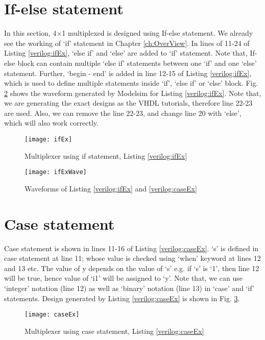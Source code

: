 \section{If-else statement} \label{sec:ifElse}
In this section, 4$\times$1 multiplexed is designed using If-else statement. We already see the working of `if' statement in Chapter \ref{ch:OverView}. In lines of 11-24 of Listing \ref{verilog:ifEx}, `else if' and `else' are added to `if' statement. Note that, If-else block can contain multiple `else if' statements between one `if' and one `else' statement. Further, `begin - end' is added in line 12-15 of Listing \ref{verilog:ifEx}, which is used to define multiple statements inside `if', `else if' or `else' block.  Fig. \ref{fig:ifExWave} shows the waveform generated by Modelsim for Listing \ref{verilog:ifEx}. 
Note that, we are generating the exact designs as the VHDL tutorials, therefore line 22-23 are used. Also, we can remove the line 22-23, and change line 20 with `else', which will also work correctly. 

\begin{figure}[!h]
	\centering
	\texttt{[image: ifEx]}
	\caption{Multiplexer using if statement, Listing \ref{verilog:ifEx}}
	\label{fig:ifEx}
\end{figure} 



\begin{figure}
	\centering
	\texttt{[image: ifExWave]}
	\caption{Waveforms of Listing \ref{verilog:ifEx} and \ref{verilog:caseEx}}
	\label{fig:ifExWave}
\end{figure}
%
%
%
%
\section{Case statement}
Case statement is shown in lines 11-16 of Listing \ref{verilog:caseEx}. `s' is defined in case statement at line 11; whose value is checked using `when' keyword at lines 12 and 13 etc. The value of y depends on the value of `s' e.g. if `s' is `1', then line 12 will be true, hence value of `i1' will be assigned to `y'. Note that, we can use `integer' notation (line 12) as well as `binary' notation (line 13)  in `case' and `if' statements. Design generated by Listing \ref{verilog:caseEx} is shown in Fig. \ref{fig:caseEx}.


\begin{figure}[!h]
	\centering
	\texttt{[image: caseEx]}
	\caption{Multiplexer using case statement, Listing \ref{verilog:caseEx}}
	\label{fig:caseEx}
\end{figure}

